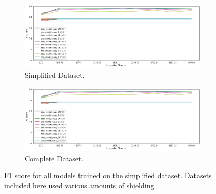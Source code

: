 \begin{figure}[H]
     \centering
     \begin{subfigure}[b]{0.9\textwidth}
         \centering
         \includegraphics[width=\textwidth]{images/results_easy_distance_comparison}
         \caption{Simplified Dataset.}
         \label{fig:results_easy_distance_comparison_simple}
     \end{subfigure}

     \begin{subfigure}[b]{0.9\textwidth}
         \centering
         \includegraphics[width=\textwidth]{images/results_easy_distance_comparison}
         \caption{Complete Dataset.}
         \label{fig:results_easy_distance_comparison_full}
     \end{subfigure}
        \caption{F1 score for all models trained on the simplified dataset. Datasets included here used various amounts of shielding.}
        \label{fig:results_easy_distance_comparison}
\end{figure}


